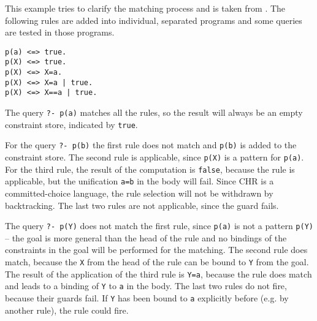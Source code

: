 \begin{example}[Matching]
This example tries to clarify the matching process and is taken from \cite[12]{fru_chr_book_2009}. The following rules are added into individual, separated programs and some queries are tested in those programs.

\begin{lstlisting}
p(a) <=> true.
p(X) <=> true.
p(X) <=> X=a.
p(X) <=> X=a | true.
p(X) <=> X==a | true.
\end{lstlisting}

The query \lstinline|?- p(a)| matches all the rules, so the result will always be an empty constraint store, indicated by \lstinline|true|.

For the query \lstinline|?- p(b)| the first rule does not match and \lstinline|p(b)| is added to the constraint store. The second rule is applicable, since \lstinline|p(X)| is a pattern for \lstinline|p(a)|. For the third rule, the result of the computation is \lstinline|false|, because the rule is applicable, but the unification \lstinline|a=b| in the body will fail. Since CHR is a committed-choice language, the rule selection will not be withdrawn by backtracking. The last two rules are not applicable, since the guard fails.

The query \lstinline|?- p(Y)| does not match the first rule, since \lstinline|p(a)| is not a pattern \lstinline|p(Y)| -- the goal is more general than the head of the rule and no bindings of the constraints in the goal will be performed for the matching. The second rule does match, because the \lstinline|X| from the head of the rule can be bound to \lstinline|Y| from the goal. The result of the application of the third rule is \lstinline|Y=a|, because the rule does match and leads to a binding of \lstinline|Y| to \lstinline|a| in the body. The last two rules do not fire, because their guards fail. If \lstinline|Y| has been bound to \lstinline|a| explicitly before (e.g. by another rule), the rule could fire.
\end{example}



